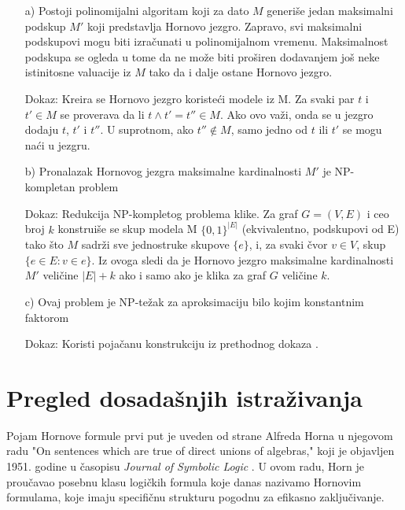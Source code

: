 \documentclass[12pt,oneside]{memoir}
\begin{document}
\begin{itemize}

	\item[a)]  Postoji polinomijalni algoritam koji za dato $M$ generiše jedan maksimalni podskup $M'$ koji predstavlja Hornovo jezgro. Zapravo, svi maksimalni podskupovi mogu biti izračunati u polinomijalnom vremenu. Maksimalnost podskupa se ogleda u tome da ne može biti proširen dodavanjem još neke istinitosne valuacije iz $M$ tako da i dalje ostane Hornovo jezgro.
 
        Dokaz: Kreira se Hornovo jezgro koristeći modele iz M. Za svaki par $t$ i $t' \in M$ se proverava da li $t \land t' = t'' \in M$. Ako ovo važi, onda se u jezgro dodaju $t$, $t'$ i $t''$. U suprotnom, ako $t'' \notin M$, samo jedno od $t$ ili $t'$ se mogu naći u jezgru.\\

	\item[b)] Pronalazak Hornovog jezgra maksimalne kardinalnosti $M'$ je NP-kompletan problem
 
	Dokaz: Redukcija NP-kompletog problema klike. Za graf $G=(V, E)$ i ceo broj $k$ konstruiše se skup modela M \subseteq $\{0,1\}^{|E|}$ (ekvivalentno, podskupovi od E) tako što $M$ sadrži sve jednostruke skupove $\{e\}$, i, za svaki čvor $v \in V$, skup $\{e \in E : v \in e\}$. Iz ovoga sledi da je Hornovo jezgro maksimalne kardinalnosti $M'$ veličine $|E|+k$ ako i samo ako je klika za graf $G$ veličine $k$.
	\item[c)] Ovaj problem je NP-težak za aproksimaciju bilo kojim konstantnim faktorom

 	Dokaz: Koristi pojačanu konstrukciju iz prethodnog dokaza \cite{doc3}.
\end{itemize}

\section{Pregled dosadašnjih istraživanja}

Pojam Hornove formule prvi put je uveden od strane Alfreda Horna u njegovom radu "On sentences which are true of direct unions of algebras," koji je objavljen 1951. godine u časopisu \textit{Journal of Symbolic Logic} \cite{doc_horn_clause}. U ovom radu, Horn je proučavao posebnu klasu logičkih formula koje danas nazivamo Hornovim formulama, koje imaju specifičnu strukturu pogodnu za efikasno zaključivanje.
\end{document}
